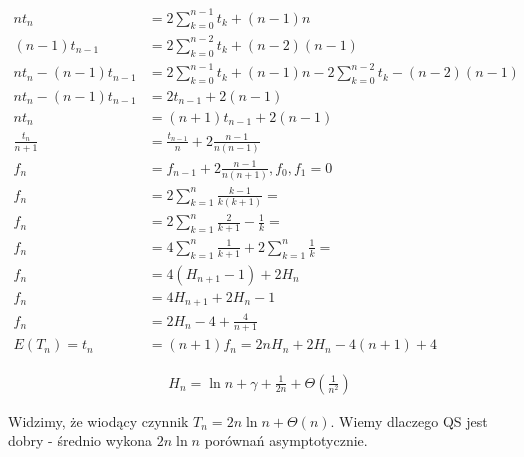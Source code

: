 \documentclass{article}
\begin{document}
\begin{align}
    n t_n &= 2 \sum_{k=0}^{n-1} t_k + (n-1)n\\
    (n-1) t_{n-1} &= 2 \sum_{k=0}^{n-2} t_k + (n-2)(n-1)\\
    n t_n - (n-1) t_{n-1} &= 2 \sum_{k=0}^{n-1} t_k + (n-1)n - 2 \sum_{k=0}^{n-2} t_k - (n-2)(n-1)\\
    n t_n - (n-1) t_{n-1} &= 2 t_{n-1} + 2 (n-1)\\
    n t_n &= (n+1) t_{n-1} + 2(n-1)\\
    \frac{t_n}{n+1} &= \frac{t_{n-1}}{n} + 2\frac{n-1}{n(n-1)}\\
    f_n &= f_{n-1} + 2\frac{n-1}{n(n+1)}, f_0, f_1 = 0\\
    f_n &= 2 \sum_{k=1}^{n} \frac{k-1}{k(k+1)} =\\
    f_n &= 2 \sum_{k=1}^{n} \frac{2}{k+1} - \frac{1}{k}=\\
    f_n &= 4 \sum_{k=1}^{n} \frac{1}{k+1} + 2\sum_{k=1}^{n} \frac{1}{k}=\\
    f_n &= 4 (H_{n+1} - 1) + 2 H_n\\
    f_n &= 4H_{n+1} + 2H_n - 1\\
    f_n &= 2H_{n} - 4 + \frac{4}{n+1}\\
    E(T_n) = t_n &= (n+1)f_n = 2nH_n + 2H_n - 4(n+1) + 4
\end{align}

\begin{align}
    H_n = \ln n + \gamma + \frac{1}{2n} + \Theta\left(\frac{1}{n^2}\right)
\end{align}

Widzimy, że wiodący czynnik $T_n = 2n\ln n + \Theta(n)$.
Wiemy dlaczego QS jest dobry - średnio wykona $2n\ln n$ porównań asymptotycznie.
\end{document}
